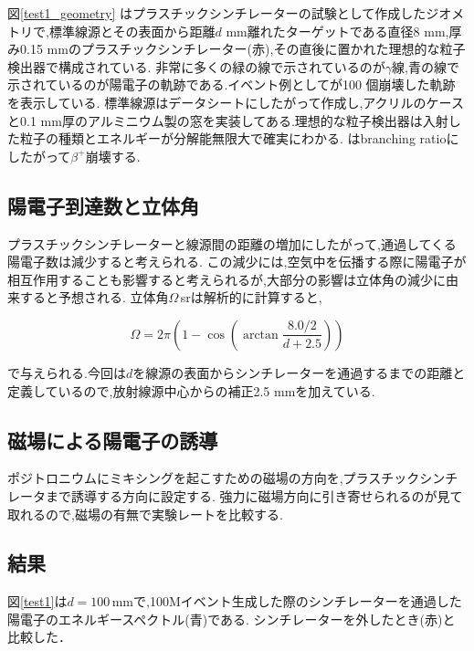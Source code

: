 図\ref{test1_geometry} はプラスチックシンチレーターの試験として作成したジオメトリで,標準線源とその表面から距離$d$ mm離れたターゲットである直径8 mm,厚み0.15 mmのプラスチックシンチレーター(赤),その直後に置かれた理想的な粒子検出器で構成されている.
非常に多くの緑の線で示されているのが$\gamma$線,青の線で示されているのが陽電子の軌跡である.イベント例としてが100 個崩壊した軌跡を表示している.
標準線源はデータシートにしたがって作成し,アクリルのケースと0.1 mm厚のアルミニウム製の窓を実装してある.理想的な粒子検出器は入射した粒子の種類とエネルギーが分解能無限大で確実にわかる.
はbranching ratioにしたがって$\beta^+$崩壊する.

\subsection{陽電子到達数と立体角}

プラスチックシンチレーターと線源間の距離の増加にしたがって,通過してくる陽電子数は減少すると考えられる.
この減少には,空気中を伝播する際に陽電子が相互作用することも影響すると考えられるが,大部分の影響は立体角の減少に由来すると予想される.
立体角$\Omega$\,srは解析的に計算すると,

\begin{equation}
	\nonumber
	\Omega = 2\pi \left( 1-\cos\left(\arctan\frac{8.0/2}{d+2.5}\right)\right)
\end{equation}

で与えられる.今回は$d$を線源の表面からシンチレーターを通過するまでの距離と定義しているので,放射線源中心からの補正2.5 mmを加えている.

\subsection{磁場による陽電子の誘導}
ポジトロニウムにミキシングを起こすための磁場の方向を,プラスチックシンチレータまで誘導する方向に設定する.
強力に磁場方向に引き寄せられるのが見て取れるので,磁場の有無で実験レートを比較する.

\subsection{結果}

図\ref{test1}は$d=100$\,mmで,100Mイベント生成した際のシンチレーターを通過した陽電子のエネルギースペクトル(青)である. シンチレーターを外したとき(赤)と比較した．

